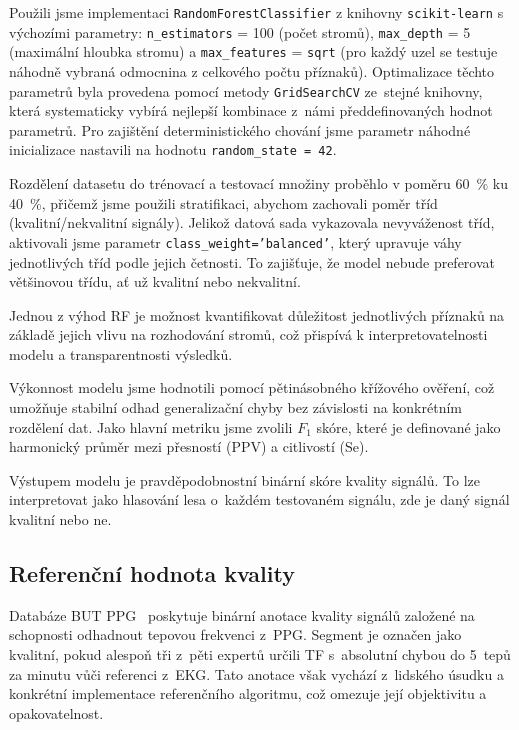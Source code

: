 Použili jsme implementaci \texttt{RandomForestClassifier} z knihovny \texttt{scikit-learn} s výchozími parametry: \texttt{n\_estimators} = 100 (počet stromů), \texttt{max\_depth} = 5 (maximální hloubka stromu) a \texttt{max\_features} = \texttt{sqrt} (pro každý uzel se testuje náhodně vybraná odmocnina z celkového počtu příznaků).
Optimalizace těchto parametrů byla provedena pomocí metody \texttt{GridSearchCV} ze~stejné knihovny, která systematicky vybírá nejlepší kombinace z~námi předdefinovaných hodnot parametrů.
Pro zajištění deterministického chování jsme parametr náhodné inicializace nastavili na hodnotu \texttt{random\_state = 42}.

Rozdělení datasetu do trénovací a testovací množiny proběhlo v poměru 60~\% ku 40~\%, přičemž jsme použili stratifikaci, abychom zachovali poměr tříd (kvalitní/nekvalitní signály).
Jelikož datová sada vykazovala nevyváženost tříd, aktivovali jsme parametr \texttt{class\_weight='balanced'}, který upravuje váhy jednotlivých tříd podle jejich četnosti.
To zajišťuje, že model nebude preferovat většinovou třídu, ať už kvalitní nebo nekvalitní.

Jednou z výhod \acs{RF} je možnost kvantifikovat důležitost jednotlivých příznaků na základě jejich vlivu na rozhodování stromů, což přispívá k interpretovatelnosti modelu a transparentnosti výsledků.

Výkonnost modelu jsme hodnotili pomocí pětinásobného křížového ověření, což umožňuje stabilní odhad generalizační chyby bez závislosti na konkrétním rozdělení dat.
Jako hlavní metriku jsme zvolili $F_1$ skóre, které je definované jako harmonický průměr mezi přesností (\acs{PPV}) a citlivostí (\acs{Se}).

Výstupem modelu je pravděpodobnostní binární skóre kvality signálů.
To lze interpretovat jako hlasování lesa o~každém testovaném signálu, zde je daný signál kvalitní nebo ne.

\subsection*{Referenční hodnota kvality}
\label{subsec:referencni_hodnota_kvality}

Databáze \acs{BUT PPG}~\cite{BUT_PPG,BUT_PPG_database} poskytuje binární anotace kvality signálů založené na schopnosti odhadnout tepovou frekvenci z~\acs{PPG}.
Segment je označen jako kvalitní, pokud alespoň tři z~pěti expertů určili \acs{TF} s~absolutní chybou do 5~tepů za minutu vůči referenci z~\acs{EKG}.
Tato anotace však vychází z~lidského úsudku a konkrétní implementace referenčního algoritmu, což omezuje její objektivitu a opakovatelnost.

